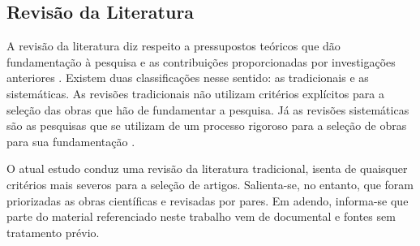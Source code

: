 

\subsection{Revisão da Literatura}\label{sub:literatura}


A revisão da literatura diz respeito a pressupostos teóricos que dão fundamentação à pesquisa e as contribuições proporcionadas por investigações anteriores \cite{carlos2002elaborar}. Existem duas classificações nesse sentido: as tradicionais e as sistemáticas. As revisões tradicionais não utilizam critérios explícitos para a seleção das obras que hão de fundamentar a pesquisa. Já as revisões sistemáticas são as pesquisas que se utilizam de um processo rigoroso para a seleção de obras para sua fundamentação \cite{ferenhof2016desmistificando}.


O atual estudo conduz uma revisão da literatura tradicional, isenta de quaisquer critérios mais severos para a seleção de artigos. Salienta-se, no entanto, que foram priorizadas as obras científicas e revisadas por pares. Em adendo, informa-se que parte do material referenciado neste trabalho vem de documental e fontes sem tratamento prévio. 







